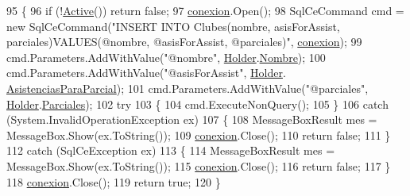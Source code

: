 \begin{DoxyCode}
95         \{
96             \textcolor{keywordflow}{if} (!\hyperlink{class_asistencias__wpf_1_1_club_d_b_manager_a8d30f338a090ebf66923be98db072831}{Active}()) \textcolor{keywordflow}{return} \textcolor{keyword}{false};
97             \hyperlink{class_asistencias__wpf_1_1_club_d_b_manager_a61a2cc885a203121fabe30817fc97b76}{conexion}.Open();
98             SqlCeCommand cmd = \textcolor{keyword}{new} SqlCeCommand(\textcolor{stringliteral}{"INSERT INTO Clubes(nombre, asisForAssist,
       parciales)VALUES(@nombre, @asisForAssist, @parciales)"}, \hyperlink{class_asistencias__wpf_1_1_club_d_b_manager_a61a2cc885a203121fabe30817fc97b76}{conexion});
99             cmd.Parameters.AddWithValue(\textcolor{stringliteral}{"@nombre"}, \hyperlink{class_asistencias__wpf_1_1_club_d_b_manager_ab1863b4e35d108dd383a66ae76f8f0a8}{Holder}.\hyperlink{class_asistencias__wpf_1_1_club_a0da21bbffe8ac3d877a51c03899bf8c2}{Nombre});
100             cmd.Parameters.AddWithValue(\textcolor{stringliteral}{"@asisForAssist"}, \hyperlink{class_asistencias__wpf_1_1_club_d_b_manager_ab1863b4e35d108dd383a66ae76f8f0a8}{Holder}.
      \hyperlink{class_asistencias__wpf_1_1_club_a1855a7a63b6465ef490871f93d385a69}{AsistenciasParaParcial});
101             cmd.Parameters.AddWithValue(\textcolor{stringliteral}{"@parciales"}, \hyperlink{class_asistencias__wpf_1_1_club_d_b_manager_ab1863b4e35d108dd383a66ae76f8f0a8}{Holder}.\hyperlink{class_asistencias__wpf_1_1_club_a9f825c0495aa564e915d0f1a9e082186}{Parciales});
102             \textcolor{keywordflow}{try}
103             \{
104                 cmd.ExecuteNonQuery();
105             \}
106             \textcolor{keywordflow}{catch} (System.InvalidOperationException ex)
107             \{
108                 MessageBoxResult mes = MessageBox.Show(ex.ToString());
109                 \hyperlink{class_asistencias__wpf_1_1_club_d_b_manager_a61a2cc885a203121fabe30817fc97b76}{conexion}.Close();
110                 \textcolor{keywordflow}{return} \textcolor{keyword}{false};
111             \}
112             \textcolor{keywordflow}{catch} (SqlCeException ex)
113             \{
114                 MessageBoxResult mes = MessageBox.Show(ex.ToString());
115                 \hyperlink{class_asistencias__wpf_1_1_club_d_b_manager_a61a2cc885a203121fabe30817fc97b76}{conexion}.Close();
116                 \textcolor{keywordflow}{return} \textcolor{keyword}{false};
117             \}
118             \hyperlink{class_asistencias__wpf_1_1_club_d_b_manager_a61a2cc885a203121fabe30817fc97b76}{conexion}.Close();
119             \textcolor{keywordflow}{return} \textcolor{keyword}{true};
120         \}
\end{DoxyCode}
